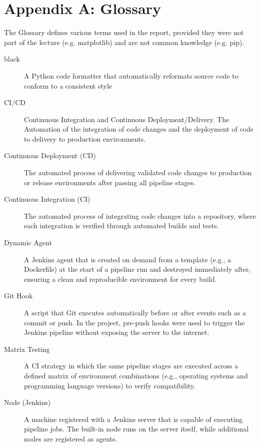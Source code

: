 \documentclass{llncs}
\begin{document}
\section*{Appendix A: Glossary}
The Glossary defines various terms used in the report, provided they were not part of the lecture (e.g. matplotlib) and are not common knowledge (e.g. pip).
\begin{description}

\item[black] A Python code formatter that automatically reformats source code to conform to a consistent style

\item[CI/CD] Continuous Integration and Continuous Deployment/Delivery. The Automation of the integration of code changes and the deployment of code to delivery to production environments.

\item[Continuous Deployment (CD)] The automated process of delivering validated code changes to production or release environments after passing all pipeline stages.

\item[Continuous Integration (CI)] The automated process of integrating code changes into a repository, where each integration is verified through automated builds and tests.

\item[Dynamic Agent] A Jenkins agent that is created on demand from a template (e.g., a Dockerfile) at the start of a pipeline run and destroyed immediately after, ensuring a clean and reproducible environment for every build.

\item[Git Hook] A script that Git executes automatically before or after events such as a commit or push. In the project, pre-push hooks were used to trigger the Jenkins pipeline without exposing the server to the internet.

\item[Matrix Testing] A CI strategy in which the same pipeline stages are executed across a defined matrix of environment combinations (e.g., operating systems and programming language versions) to verify compatibility.

\item[Node (Jenkins)] A machine registered with a Jenkins server that is capable of executing pipeline jobs. The built-in node runs on the server itself, while additional nodes are registered as agents.


\end{description}
\end{document}
